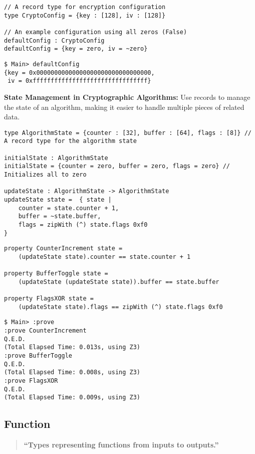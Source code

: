 \begin{lstlisting}[style=cryptol]
// A record type for encryption configuration
type CryptoConfig = {key : [128], iv : [128]} 

// An example configuration using all zeros (False)
defaultConfig : CryptoConfig
defaultConfig = {key = zero, iv = ~zero}
\end{lstlisting}
\begin{lstlisting}[style=zsh]
$ Main> defaultConfig
{key = 0x00000000000000000000000000000000,
 iv = 0xffffffffffffffffffffffffffffffff}
\end{lstlisting}
\vspace{16pt}
\textbf{State Management in Cryptographic Algorithms:} Use records to manage the state of an algorithm, making it easier to handle multiple pieces of related data.
\begin{lstlisting}[style=cryptol]
type AlgorithmState = {counter : [32], buffer : [64], flags : [8]} // A record type for the algorithm state

initialState : AlgorithmState
initialState = {counter = zero, buffer = zero, flags = zero} // Initializes all to zero

updateState : AlgorithmState -> AlgorithmState
updateState state =  { state |
	counter = state.counter + 1, 
	buffer = ~state.buffer, 
	flags = zipWith (^) state.flags 0xf0
}
\end{lstlisting}

\begin{lstlisting}[style=cryptol]
property CounterIncrement state = 
	(updateState state).counter == state.counter + 1

property BufferToggle state = 
	(updateState (updateState state)).buffer == state.buffer

property FlagsXOR state = 
	(updateState state).flags == zipWith (^) state.flags 0xf0
\end{lstlisting}

\begin{lstlisting}[style=zsh]
$ Main> :prove
:prove CounterIncrement
Q.E.D.
(Total Elapsed Time: 0.013s, using Z3)
:prove BufferToggle
Q.E.D.
(Total Elapsed Time: 0.008s, using Z3)
:prove FlagsXOR
Q.E.D.
(Total Elapsed Time: 0.009s, using Z3)
\end{lstlisting}

\newpage
\subsection{Function}
\begin{quote}\bf
``Types representing functions from inputs to outputs.''
\end{quote}


